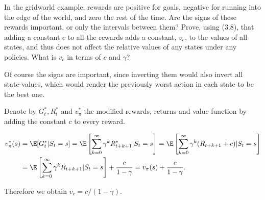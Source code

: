 
\begin{exercise}[Exercise 3.15]

In the gridworld example, rewards are positive for goals, negative for running
into the edge of the world, and zero the rest of the time. Are the signs of these
rewards important, or only the intervals between them?
Prove, using (3.8), that adding a constant $c$ to all the rewards adds a constant, $v_c$,
to the values of all states, and thus does not affect the relative values of any
states under any policies. What is $v_c$ in terms of $c$ and $\gamma$?

\end{exercise}


\begin{solution}

Of course the signs are important, since inverting them would also invert all
state-values, which would render the previously worst action in each state to be the best one.

Denote by $G_t^*, R_t^*$ and $v_\pi^*$ the modified rewards, returns and value function by adding the constant $c$ to every reward.

\begin{align*}
  v_\pi^*(s) &= \E[G_t^* | S_t = s] = \E\left[\sum_{k=0}^{\infty}\gamma^kR_{t+k+1}^* | S_t = s\right]
  = \E\left[\sum_{k=0}^{\infty}\gamma^k(R_{t+k+1} + c) | S_t = s\right] \\
  &= \E\left[\sum_{k=0}^{\infty}\gamma^kR_{t+k+1} | S_t = s\right] + \frac{c}{1 - \gamma}
  = v_\pi(s) + \frac{c}{1 - \gamma}.
\end{align*}

Therefore we obtain $v_c = c/(1-\gamma)$.

\end{solution}

